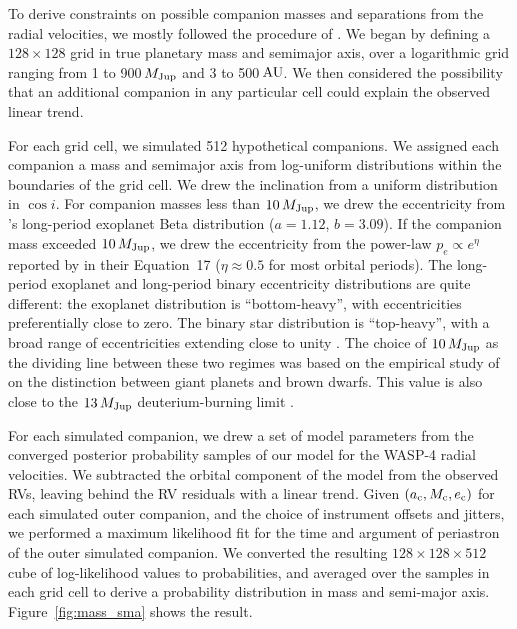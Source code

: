 \documentclass[12pt,twocolumn,tighten]{aastex62}
\begin{document}
To derive constraints on possible companion masses and separations
from the radial velocities, we mostly followed the procedure of
\citet{bryan_excess_2019}. We began by defining a $128\times128$ grid
in true planetary mass and semimajor axis, over a logarithmic grid
ranging from 1 to 900$\,$$M_{\rm Jup}$ and 3 to 500$\,$${\rm AU}$.  We
then considered the possibility that an additional companion in any
particular cell could explain the observed linear trend.

For each grid cell, we simulated 512 hypothetical companions. We
assigned each companion a mass and semimajor axis from log-uniform
distributions within the boundaries of the grid cell. We drew the
inclination from a uniform distribution in $\cos i$.  For companion
masses less than $10\,M_{\rm Jup}$, we drew the eccentricity from
\citet{kipping_beta_2013}'s long-period exoplanet Beta distribution
($a=1.12$, $b=3.09$).  If the companion mass exceeded $10\,M_{\rm
Jup}$, we drew the eccentricity from the power-law $p_e \propto
e^\eta$ reported by \citet{moe_mind_2017} in their Equation~17 ($\eta
\approx 0.5$ for most orbital periods).  The long-period exoplanet and
long-period binary eccentricity distributions are quite different: the
exoplanet distribution is ``bottom-heavy'', with eccentricities
preferentially close to zero.  The binary star distribution is
``top-heavy'', with a broad range of eccentricities extending close to
unity \citep{moe_mind_2017,price-whelan_close_2020}.  The choice of
$10\,M_{\rm Jup}$ as the dividing line between these two regimes was
based on the empirical study of \citet{schlaufman_evidence_2018} on
the distinction between giant planets and brown dwarfs. This value is
also close to the $13\,M_{\rm Jup}$ deuterium-burning limit
\citep[{\it e.g.},][]{burrows_nongray_1997}.

For each simulated companion, we drew a set of model parameters from
the converged posterior probability samples of our model for the
WASP-4 radial velocities.  We subtracted the orbital component of the
model from the observed RVs, leaving behind the RV residuals with a
linear trend.  Given $(a_{\rm c}, M_{\rm c}, e_{\rm c})$ for each
simulated outer companion, and the choice of instrument offsets and
jitters, we performed a maximum likelihood fit for the time and
argument of periastron of the outer simulated companion.  We converted
the resulting $128\times128\times512$ cube of log-likelihood values to
probabilities, and averaged over the samples in each grid cell to
derive a probability distribution in mass and semi-major axis.
Figure~\ref{fig:mass_sma} shows the result.
\end{document}
